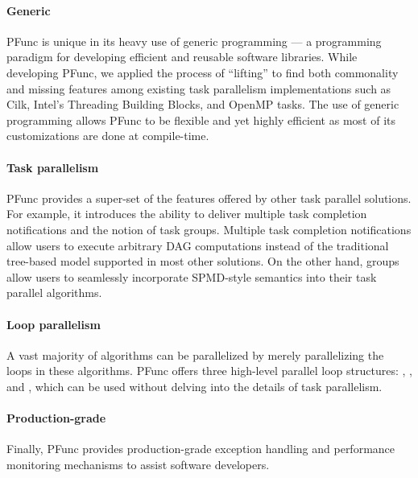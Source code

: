 %
\paragraph{Generic}
%
PFunc is unique in its heavy use of generic programming --- a programming
paradigm for developing efficient and reusable software libraries.
While developing PFunc, we applied the process of ``lifting'' to find both
commonality and missing features among existing task parallelism
implementations such as Cilk, Intel's Threading Building Blocks, and OpenMP
tasks.
%
The use of generic programming allows PFunc to be flexible and yet highly 
efficient as most of its customizations are done at compile-time.

%
\paragraph{Task parallelism}
%
PFunc provides a super-set of the features offered by other task parallel
solutions.
%
For example, it introduces the ability to deliver multiple task completion
notifications and the notion of task groups.
%
Multiple task completion notifications allow users to execute arbitrary DAG 
computations instead of the traditional tree-based model supported in most 
other solutions.
%
On the other hand, groups allow users to seamlessly incorporate SPMD-style
semantics into their task parallel algorithms.

%
\paragraph{Loop parallelism}
%
A vast majority of algorithms can be parallelized by merely parallelizing the 
loops in these algorithms.
%
PFunc offers three high-level parallel loop structures: ,
, and , which can be used without delving into the
details of task parallelism. 

%
\paragraph{Production-grade}
%
Finally, PFunc provides production-grade exception handling and performance
monitoring mechanisms to assist software developers.
